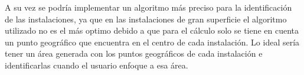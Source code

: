 A su vez se podría implementar un algoritmo más preciso para la identificación de las instalaciones, ya que en las instalaciones de gran superficie el algoritmo utilizado no es el más optimo debido a que para el cálculo solo se tiene en cuenta un punto geográfico que encuentra en el centro de cada instalación. Lo ideal sería tener un área generada con los puntos geográficos de cada instalación e identificarlas cuando el usuario enfoque a esa área.





